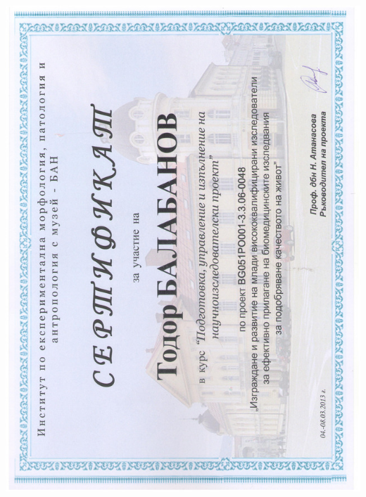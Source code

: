 \documentclass[bulgarian,a4paper]{europasscv}
\begin{document}
\includegraphics[width=\textwidth,height=\textheight,keepaspectratio]{IEMPAM2013_3}
\end{document}
